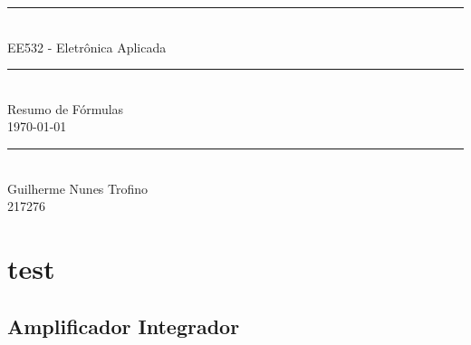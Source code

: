 \documentclass{article}
\begin{document}
    \begin{titlepage}
        \begin{center}
            \rule{450pt}{0.5pt}\\[4mm]
            {\Huge EE532 - Eletrônica Aplicada}\\
            \rule{450pt}{0.5pt}\\[2mm]
            {\Large Resumo de Fórmulas}\\[200mm]
            \today\\
            \rule{250pt}{0.5pt}\\
            {\large Guilherme Nunes Trofino}\\
            {\large 217276}\\
        \end{center}
    \end{titlepage}
\newpage

    \section{test}
    \subsection{Amplificador Integrador}
\end{document}
